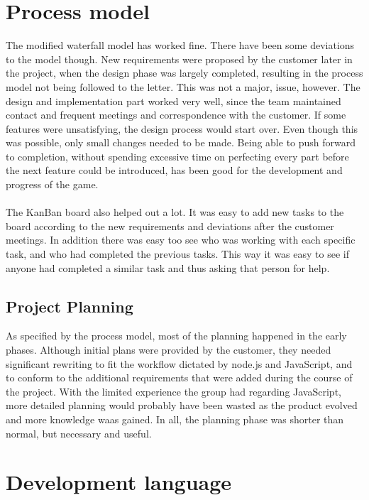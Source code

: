 \section{Process model}

The modified waterfall model has worked fine. There have been some deviations to the model though. New requirements were
proposed by the customer later in the project, when the design phase was largely completed, resulting in the process model not being followed
to the letter. This was not a major, issue, however. The design and implementation part worked very well, since the 
team maintained contact and frequent meetings and correspondence with the customer. If some features were unsatisfying, the design process would 
start over. Even though this was possible, only small changes needed to be made. Being able to push forward to completion, without spending excessive time on perfecting every part before the next feature could be introduced, has been good for the development and progress of the game. \\
\\
The KanBan board also helped out a lot. It was easy to add new tasks to the board according to the new requirements and deviations after the customer meetings. In addition there was easy too see who was working with each specific task, and who had completed the previous tasks. This way it was easy to see if anyone had completed a similar task and thus asking that person for help.


\subsection{Project Planning}

As specified by the process model, most of the planning happened in the early phases. Although initial plans were provided by the customer, they needed significant rewriting to fit the workflow dictated by node.js and JavaScript, and to conform to the additional requirements that were added during the course of the project. With the limited experience the group had regarding JavaScript, more detailed planning would probably have been wasted as the product evolved and more knowledge waas gained. In all, the planning phase was shorter than normal, but necessary and useful.


\section{Development language}

